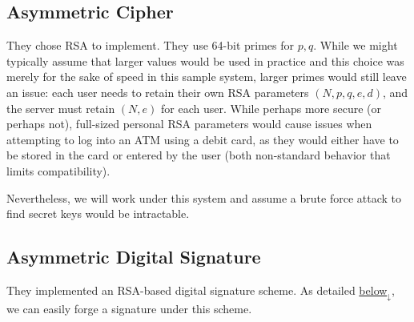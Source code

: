 \documentclass{article}
\begin{document}
\subsection{Asymmetric Cipher}
They chose RSA to implement. They use 64-bit primes for $p,q$.
While we might typically assume that larger values would be used in practice and this choice was merely for
the sake of speed in this sample system, larger primes would still leave an issue:
each user needs to retain their own RSA parameters $(N, p, q, e, d)$, and the server must retain $(N, e)$ for each user.
While perhaps more secure (or perhaps not), full-sized personal RSA parameters would cause issues when attempting
to log into an ATM using a debit card, as they would either have to be stored in the card or entered by the user
(both non-standard behavior that limits compatibility).

Nevertheless, we will work under this system and assume a brute force attack to find secret keys would be intractable.

\subsection{Asymmetric Digital Signature}
They implemented an RSA-based digital signature scheme.
As detailed \hyperref[sec:signaturebad]{below$_\downarrow$}, we can easily forge a signature under this scheme.

\pagebreak[3]
\end{document}
